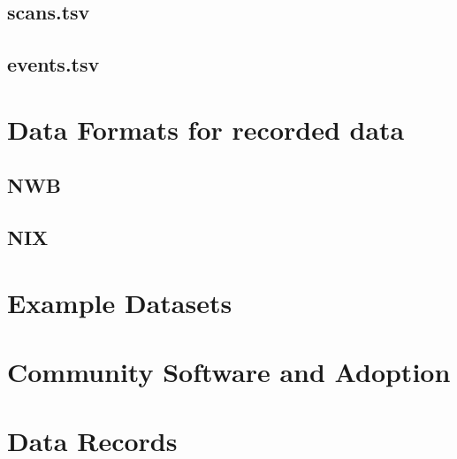 \documentclass[fleqn,10pt]{wlscirep}
\begin{document}
\subsection*{scans.tsv}
\subsection*{events.tsv}
\section*{Data Formats for recorded data}
\subsection*{NWB}
\subsection*{NIX}
\section*{Example Datasets}
\section*{Community Software and Adoption}
 

\section*{Data Records}


\end{document}

